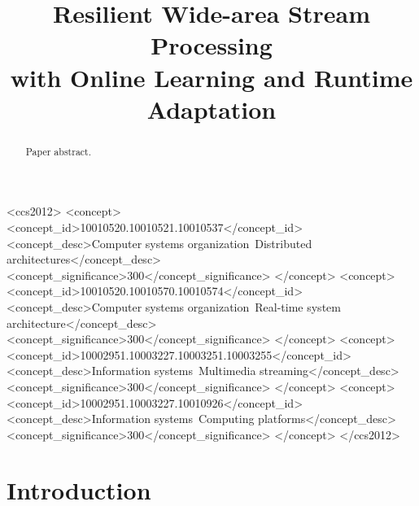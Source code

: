 \documentclass[sigplan, anonymous, review]{acmart}
\begin{document}
\title{Resilient Wide-area Stream Processing \\
  with Online Learning and Runtime Adaptation}

\renewcommand{\shortauthors}{B. Zhang et al.}

\begin{abstract}
  Paper abstract.
\end{abstract}

%
%
\begin{CCSXML}
<ccs2012>
  <concept>
    <concept_id>10010520.10010521.10010537</concept_id>
    <concept_desc>Computer systems organization~Distributed architectures</concept_desc>
    <concept_significance>300</concept_significance>
  </concept>
  <concept>
    <concept_id>10010520.10010570.10010574</concept_id>
    <concept_desc>Computer systems organization~Real-time system architecture</concept_desc>
    <concept_significance>300</concept_significance>
  </concept>
  <concept>
    <concept_id>10002951.10003227.10003251.10003255</concept_id>
    <concept_desc>Information systems~Multimedia streaming</concept_desc>
    <concept_significance>300</concept_significance>
  </concept>
  <concept>
    <concept_id>10002951.10003227.10010926</concept_id>
    <concept_desc>Information systems~Computing platforms</concept_desc>
    <concept_significance>300</concept_significance>
  </concept>
</ccs2012>
\end{CCSXML}




\maketitle

\section{Introduction}
\end{document}
